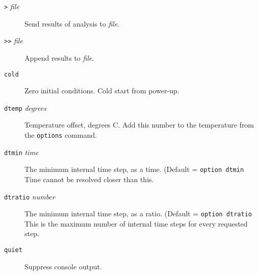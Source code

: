 \begin{description}


\item[{\tt >} {\it file}]
Send results of analysis to {\it file}.

\item[{\tt >>} {\it file}]
Append results to {\it file}.



\item[{\tt cold}]
Zero initial conditions.  Cold start from power-up.



\item[{\tt dtemp} {\it degrees}]
Temperature offset, degrees C.  Add this number to the temperature
from the {\tt options} command.

\item[{\tt dtmin} {\it time}]
The minimum internal time step, as a time.  (Default = {\tt option
dtmin} Time cannot be resolved closer than this.

\item[{\tt dtratio} {\it number}]
The minimum internal time step, as a ratio.  (Default = {\tt option
dtratio} This is the maximum number of internal time steps for every
requested step.




\item[{\tt quiet}]
Suppress console output.


\end{description}
